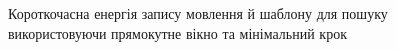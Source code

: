         \begin{figure}[h]
            \centering

            \caption{Короткочасна енергія запису мовлення й шаблону для пошуку використовуючи прямокутне вікно та
                мінімальний крок}
            \label{fig:audio-energy-rect-min}
        \end{figure}

